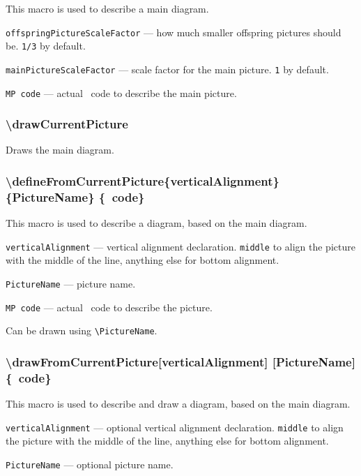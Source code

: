 \documentclass{ltxdoc}
\begin{document}
	This macro is used to describe a main diagram.

	\texttt{offspringPictureScaleFactor} — how much smaller offspring pictures should be. \texttt{1/3} by default.
	
	\texttt{mainPictureScaleFactor} — scale factor for the main picture. \texttt{1} by default.
	
	\texttt{MP code} — actual \METAPOST\ code to describe the main picture.

\subsubsection{\textbackslash drawCurrentPicture}
	
	Draws the main diagram.




\subsubsection{\textbackslash defineFromCurrentPicture\{verticalAlignment\} \{PictureName\} \{\METAPOST\ code\}}

	This macro is used to describe a diagram, based on the main diagram.

	\texttt{verticalAlignment} — vertical alignment declaration. \texttt{middle} to align the picture with the middle of the line, anything else for bottom alignment.

	\texttt{PictureName} — picture name.

	\texttt{MP code} — actual \METAPOST\ code to describe the picture.
	
	Can be drawn using \texttt{\textbackslash PictureName}.
	
\subsubsection{\textbackslash drawFromCurrentPicture[verticalAlignment] [PictureName] \{\METAPOST\ code\}}

	This macro is used to describe and draw a diagram, based on the main diagram.

	\texttt{verticalAlignment} — optional vertical alignment declaration. \texttt{middle} to align the picture with the middle of the line, anything else for bottom alignment.

	\texttt{PictureName} — optional picture name.
\end{document}
